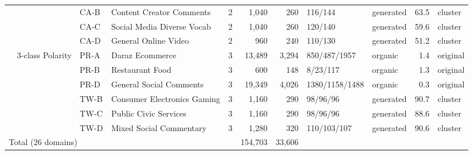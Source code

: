 {\begin{tabular}{llllrrrllrl}
 &  & CA-B & Content Creator Comments & 2 & 1,040 & 260 & 116/144 & generated & 63.5 & cluster \\
 &  & CA-C & Social Media Diverse Vocab & 2 & 1,040 & 260 & 120/140 & generated & 59.6 & cluster \\
 &  & CA-D & General Online Video & 2 & 960 & 240 & 110/130 & generated & 51.2 & cluster \\
\midrule
 & 3-class Polarity & PR-A & Daraz Ecommerce & 3 & 13,489 & 3,294 & 850/487/1957 & organic & 1.4 & original \\
 &  & PR-B & Restaurant Food & 3 & 600 & 148 & 8/23/117 & organic & 1.3 & original \\
 &  & PR-D & General Social Comments & 3 & 19,349 & 4,026 & 1380/1158/1488 & organic & 0.3 & original \\
 &  & TW-B & Consumer Electronics Gaming & 3 & 1,160 & 290 & 98/96/96 & generated & 90.7 & cluster \\
 &  & TW-C & Public Civic Services & 3 & 1,160 & 290 & 98/96/96 & generated & 88.6 & cluster \\
 &  & TW-D & Mixed Social Commentary & 3 & 1,280 & 320 & 110/103/107 & generated & 90.6 & cluster \\
\midrule
\multicolumn{5}{l}{Total (26 domains)} & 154,703 & 33,606 & & & & \\
\bottomrule
\end{tabular}}
